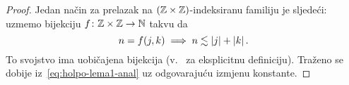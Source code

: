 \documentclass[main.tex]{subfiles}
\begin{document}
\begin{proof}
	Jedan način za prelazak na \( (\mathbb{Z}\times\mathbb{Z}) \)-indeksiranu familiju je sljedeći:
	uzmemo bijekciju \( f\colon \mathbb{Z}\times\mathbb{Z} \to \mathbb{N} \) takvu da
	\[
		n = f(j,k) \implies n \lesssim \left| {j} \right| + \left| {k} \right|.
	\]
	To svojstvo ima uobičajena bijekcija (v.~\cite[lema~2]{jourfa-ayache} za eksplicitnu definiciju).
	Traženo se dobije iz~\eqref{eq:holpo-lema1-anal} uz odgovarajuću izmjenu konstante.

\end{proof}
\end{document}
